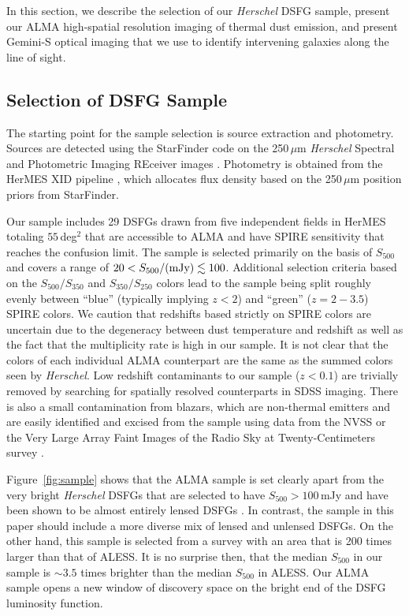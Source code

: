 \documentclass[iop]{emulateapj}
\begin{document}
In this section, we describe the selection of our {\it Herschel} DSFG sample,
present our ALMA high-spatial resolution imaging of thermal dust emission, and
present Gemini-S optical imaging that we use to identify intervening galaxies
along the line of sight.  

\subsection{Selection of DSFG Sample}\label{sec:select}

The starting point for the sample selection is source extraction and
photometry.  Sources are detected using the {\sc StarFinder} code
\citep{Diolaiti:2000qy} on the 250$\, \mu$m {\it Herschel} Spectral and
Photometric Imaging REceiver \citep[SPIRE;][]{2010A&A...518L...3G} images
\citep{Wang:2014lr}.
Photometry is obtained from the HerMES XID pipeline \citep{Roseboom:2010lk},
which allocates flux density based on the 250$\, \mu$m position priors from
{\sc StarFinder}.  

Our sample includes 29 DSFGs drawn from five independent fields in HerMES
totaling $55\,$deg$^2$ that are accessible to ALMA and have SPIRE sensitivity
that reaches the confusion limit.  The sample is selected primarily on the
basis of $S_{500}$ and covers a range of $20 < S_{500}/{\rm (mJy)} \lesssim
100$.  Additional selection criteria based on the $S_{500}/S_{350}$ and
$S_{350}/S_{250}$ colors lead to the sample being split roughly evenly between
``blue'' (typically implying $z < 2$) and ``green'' ($z = 2-3.5$) SPIRE colors.
We caution that redshifts based strictly on SPIRE colors are uncertain due to
the degeneracy between dust temperature and redshift as well as the fact that
the multiplicity rate is high in our sample.  It is not clear that the colors
of each individual ALMA counterpart are the same as the summed colors seen by
{\it Herschel}.  Low redshift contaminants to our sample ($z < 0.1$) are
trivially removed by searching for spatially resolved counterparts in SDSS
imaging.  There is also a small contamination from blazars, which are
non-thermal emitters and are easily identified and excised from the sample
using data from the NVSS or the Very Large Array Faint Images of the Radio Sky
at Twenty-Centimeters survey \citep[FIRST;][]{Becker:1995fj}.  

Figure~\ref{fig:sample} shows that the ALMA sample is set clearly apart from the
very bright {\it Herschel} DSFGs that are selected to have $S_{500} > 100 \,
$mJy and have been shown to be almost entirely lensed DSFGs
\citep{Negrello:2010fk, Wardlow:2013lr, Bussmann:2013lr}.  In contrast, the
sample in this paper should include a more diverse mix of lensed and unlensed
DSFGs.  On the other hand, this sample is selected from a survey with an area
that is 200 times larger than that of ALESS.  It is no surprise then, that the
median $S_{500}$ in our sample is $\sim3.5$ times brighter than the median
$S_{500}$ in ALESS.  Our ALMA sample opens a new window of discovery space on
the bright end of the DSFG luminosity function.
\end{document}
